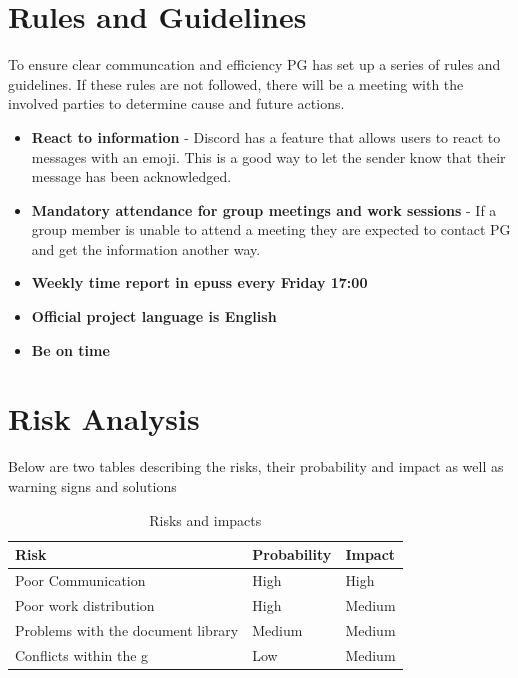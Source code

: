 \documentclass{article}
\begin{document}
\section{Rules and Guidelines} %
    To ensure clear communcation and efficiency PG has set up a series of rules and guidelines. If these rules are not followed, there will be a meeting with the involved parties to determine cause and future actions. 
    
    \begin{itemize}
        \item \textbf{React to information} - Discord has a feature that allows users to react to messages with an emoji. This is a good way to let the sender know that their message has been acknowledged.
        \item \textbf{Mandatory attendance for group meetings and work sessions} - If a group member is unable to attend a meeting they are expected to contact PG and get the information another way.  
        \item \textbf{Weekly time report in epuss every Friday 17:00}
        \item \textbf{Official project language is English}
        \item \textbf{Be on time}
    \end{itemize}

\section{Risk Analysis}
    Below are two tables describing the risks, their probability and impact as well as warning signs and solutions
    
    \begin{table}[h]
        \centering
        \begin{tabular}{|l|l|l|}
             \hline
             \textbf{Risk} 
             & \textbf{Probability}
             & \textbf{Impact} \\
             \hline
             Poor Communication 
             & High
             & High \\
             \hline
             Poor work distribution
             & High
             & Medium \\
             \hline
             Problems with the document library
             & Medium
             & Medium \\
             \hline
             Conflicts within the g
             & Low
             & Medium \\
             \hline
        \end{tabular}
        \caption{Risks and impacts}
        \label{tab:my_label}
    \end{table}
\end{document}
